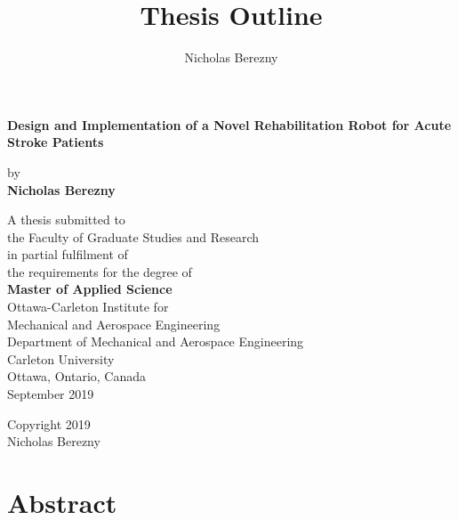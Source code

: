 \documentclass[12pt]{report}
\author{Nicholas Berezny}
\title{Thesis Outline}
\begin{document}
\newpage

\begin{center}
{\LARGE \textbf{Design and Implementation of a Novel Rehabilitation Robot for Acute Stroke  Patients}}

\vspace{1.5cm}
by  \\
\vspace{1.5cm}
{\Large \textbf{Nicholas Berezny}}
\vspace{1cm}

A thesis submitted to \\
the Faculty of Graduate Studies and Research \\
in partial fulfilment of \\
the requirements for the degree of \\
\textbf{Master of Applied Science} \\

\vspace{1cm}
Ottawa-Carleton Institute for \\
Mechanical and Aerospace Engineering \\

\vspace{1cm}
Department of Mechanical and Aerospace Engineering \\
Carleton University \\
Ottawa, Ontario, Canada \\
September 2019 \\
\vspace{1cm}

Copyright \textcopyright \hspace{0.08cm} 2019 \\
Nicholas Berezny
\end{center}
\thispagestyle{empty}
\clearpage
\afterpage{\null\newpage}
\thispagestyle{empty}
\clearpage
\newpage
{} 





\chapter*{Abstract}
\end{document}
